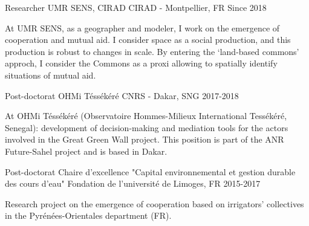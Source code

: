 

\begin{cventries}

  \cventry
    {Researcher} %
    {UMR SENS, CIRAD} %
    {CIRAD - Montpellier, FR} %
    {Since 2018} %
    {
      \begin{cvitems} %
        At UMR SENS, as a geographer and modeler, I work on the emergence of cooperation and mutual aid. I consider space as a social production, and this production is robust to changes in scale. By entering the ‘land-based commons’ approch, I consider the Commons as a proxi allowing to spatially identify situations of mutual aid.
      \end{cvitems}
    }


\cventry
  {Post-doctorat} %
  {OHMi Téssékéré} %
  {CNRS - Dakar, SNG} %
  {2017-2018} %
  {
    \begin{cvitems} %
      At OHMi Téssékéré (Observatoire Hommes-Milieux International Tessékéré, Senegal): development of decision-making and mediation tools for the actors involved in the Great Green Wall project. This position is part of the ANR Future-Sahel project and is based in Dakar.
    \end{cvitems}
  }

\cventry
  {Post-doctorat} %
  {Chaire d'excellence "Capital environnemental et gestion durable des cours d'eau"} %
  {Fondation de l'université de Limoges, FR} %
  {2015-2017} %
  {
    \begin{cvitems} %
      Research project on the emergence of cooperation based on irrigators' collectives in the Pyrénées-Orientales department (FR).
    \end{cvitems}
  }


\end{cventries}
